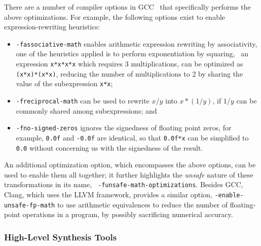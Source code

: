 There are a number of compiler options in GCC~\cite{gcc} that specifically
performs the above optimizations.  For example, the following options exist to
enable expression-rewriting heuristics:
\begin{itemize}

    \item \verb|-fassociative-math| enables arithmetic expression rewriting by
    associativity, one of the heuristics applied is to perform exponentiation
    by squaring, \eg~an expression \verb|x*x*x*x| which requires 3
    multiplications, can be optimized as \verb|(x*x)*(x*x)|, reducing the
    number of multiplications to 2 by sharing the value of the subexpression
    \verb|x*x|;

    \item \verb|-freciprocal-math| can be used to rewrite $x / y$ into $x * (1
    / y)$, if $1 / y$ can be commonly shared among subexpressions; and

    \item \verb|-fno-signed-zeros| ignores the signedness of floating point
    zeros, for example, \verb|0.0f| and \verb|-0.0f| are identical, so that
    \verb|0.0f*x| can be simplified to \verb|0.0| without concerning us with
    the signedness of the result.

\end{itemize}

An additional optimization option, which encompasses the above options,
can be used to enable them all together; it further highlights
the \emph{unsafe} nature of these transformations in its name,
\ie~\verb|-funsafe-math-optimizations|.  Besides GCC, Clang, which uses the
LLVM framework, provides a similar option, \verb|-enable-unsafe-fp-math| to use
arithmetic equivalences to reduce the number of floating-point operations in a
program, by possibly sacrificing numerical accuracy.


\subsubsection{High-Level Synthesis Tools}

